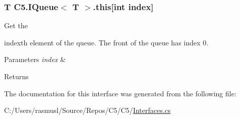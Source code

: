 \subsubsection[{this[int index]}]{\setlength{\rightskip}{0pt plus 5cm}T {\bf C5.\+I\+Queue}$<$ T $>$.this\mbox{[}int index\mbox{]}\hspace{0.3cm}{\ttfamily [get]}}\label{interface_c5_1_1_i_queue_a750c0af1f1ec226a1729f841fcc1dfe9}


Get the 

{\ttfamily index}\textquotesingle{}th element of the queue. The front of the queue has index 0. 


\begin{DoxyParams}{Parameters}
{\em index} & \\
\hline
\end{DoxyParams}
\begin{DoxyReturn}{Returns}

\end{DoxyReturn}


The documentation for this interface was generated from the following file\+:\begin{DoxyCompactItemize}
\item 
C\+:/\+Users/rasmusl/\+Source/\+Repos/\+C5/\+C5/\hyperlink{_interfaces_8cs}{Interfaces.\+cs}\end{DoxyCompactItemize}
